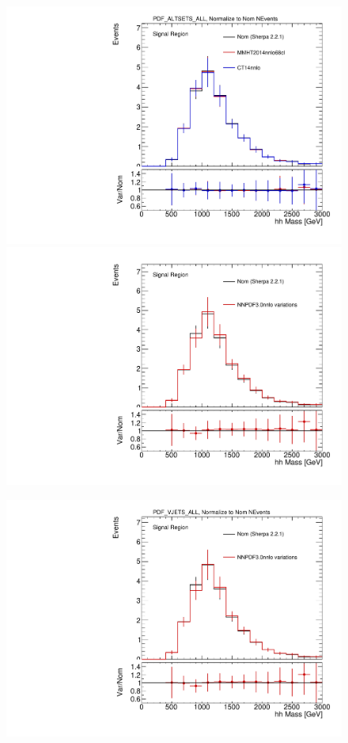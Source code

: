 \begin{figure}[!htbp]
\begin{center}
\includegraphics[scale=0.33]{./figures/boosted/systematics/zjets_alt_hhMass_SR_syst_PDF_ALTSETS_ALL}
 \\
\includegraphics[scale=0.33]{./figures/boosted/systematics/zjets_alt_hhMass_SR_syst_PDF_VJETS_ALL_UnNormalized}

\includegraphics[scale=0.33]{./figures/boosted/systematics/zjets_alt_hhMass_SR_syst_PDF_VJETS_ALL}


\end{center}
\end{figure}

